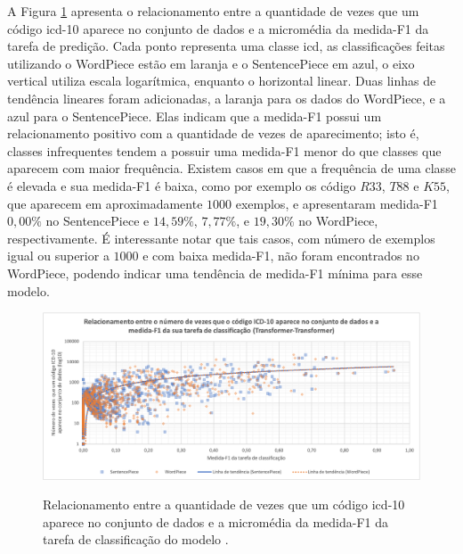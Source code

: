 A Figura \ref{fig:result_appears_vs_f1_xfmr_xfmr} apresenta o relacionamento entre a quantidade de vezes que um código \gls{icd}-10 aparece no conjunto de dados e a micromédia da medida-F1 da tarefa de predição. Cada ponto representa uma classe \gls{icd}, as classificações feitas utilizando o WordPiece estão em laranja e o SentencePiece em azul, o eixo vertical utiliza escala logarítmica, enquanto o horizontal linear. Duas linhas de tendência lineares foram adicionadas, a laranja para os dados do WordPiece, e a azul para o SentencePiece. Elas indicam que a medida-F1 possui um relacionamento positivo com a quantidade de vezes de aparecimento; isto é, classes infrequentes tendem a possuir uma medida-F1 menor do que classes que aparecem com maior frequência. Existem casos em que a frequência de uma classe é elevada e sua medida-F1 é baixa, como por exemplo os código $R33$, $T88$ e $K55$, que aparecem em aproximadamente $1000$ exemplos, e apresentaram medida-F1 $0,00\%$ no SentencePiece e $14,59\%$, $7,77\%$, e $19,30\%$ no WordPiece, respectivamente. É interessante notar que tais casos, com número de exemplos igual ou superior a $1000$ e com baixa medida-F1, não foram encontrados no WordPiece, podendo indicar uma tendência de medida-F1 mínima para esse modelo.
\begin{figure}[htbp]
    \centering
        \caption{Relacionamento entre a quantidade de vezes que um código \gls{icd}-10 aparece no conjunto de dados e a micromédia da medida-F1 da tarefa de classificação do modelo \xfmrxfmr{}.}
        \includegraphics[width=\textwidth]{resources/images/results/result_appears_vs_f1_xfmr_xfmr_log_ptbr.png}
        \label{fig:result_appears_vs_f1_xfmr_xfmr}
\end{figure}

